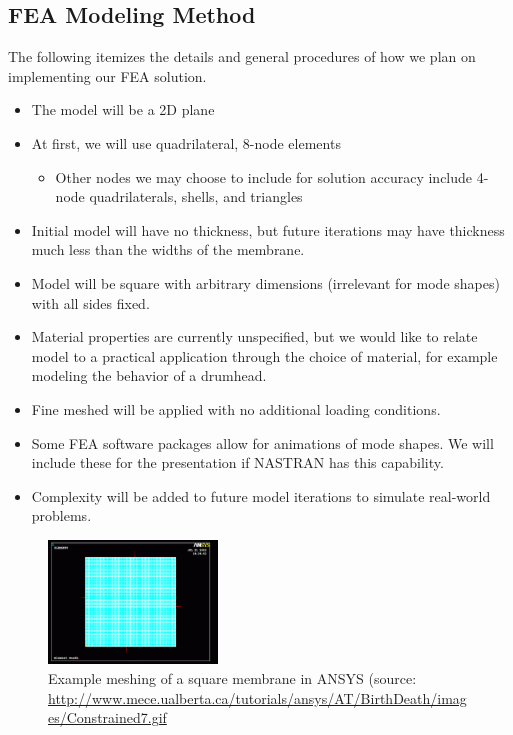 \documentclass[10pt]{article}
\begin{document}
\subsection*{FEA Modeling Method}
The following itemizes the details and general procedures of how we plan on implementing our FEA solution.
\begin{itemize}
	\item{The model will be a 2D plane}
	\item{At first, we will use quadrilateral, 8-node elements}
	\begin{itemize}
		\item{Other nodes we may choose to include for solution accuracy include 4-node quadrilaterals, shells, and triangles}
	\end{itemize}
	\item{Initial model will have no thickness, but future iterations may have thickness much less than the widths of the membrane.}
	\item{Model will be square with arbitrary dimensions (irrelevant for mode shapes) with all sides fixed.}
	\item{Material properties are currently unspecified, but we would like to relate model to a practical application through the choice of material, for example modeling the behavior of a drumhead.}
	\item{Fine meshed will be applied with no additional loading conditions.}
	\item{Some FEA software packages allow for animations of mode shapes.  We will include these for the presentation if NASTRAN has this capability.}
	\item{Complexity will be added to future model iterations to simulate real-world problems.}
\end{itemize}
\begin{figure}[h]
	\centering
	\includegraphics[width=0.4\textwidth]{Constrained7}
	\caption{Example meshing of a square membrane in ANSYS (source: \url{http://www.mece.ualberta.ca/tutorials/ansys/AT/BirthDeath/images/Constrained7.gif}}
\end{figure}
\end{document}
